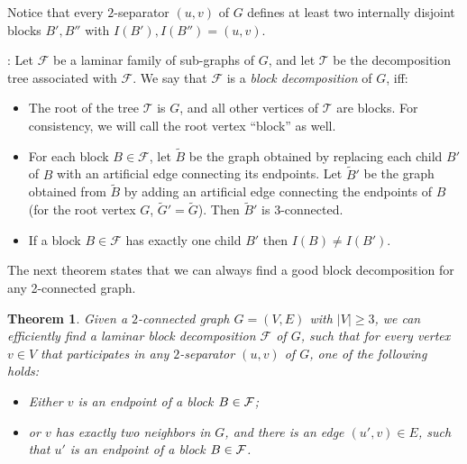 \documentclass[twoside,leqno,twocolumn]{article}
\newcommand{\tset}{{\mathcal T}}
\newcommand{\fset}{{\mathcal{F}}}
\newtheorem{theorem}{Theorem}
\newenvironment{Definition}{{\bf Definition}: }{}
\begin{document}
Notice that every $2$-separator $(u,v)$ of $G$ defines at least two internally disjoint blocks $B',B''$ with $I(B'),I(B'')=(u,v)$.

\begin{Definition}
Let $\fset$ be a laminar family of sub-graphs of $G$, and let $\tset$ be the decomposition tree associated with $\fset$. We say that $\fset$ is a \emph{block decomposition} of $G$, iff:

\begin{itemize}
\item The root of the tree $\tset$ is $G$, and all other vertices of $\tset$ are blocks. For consistency, we will call the root vertex ``block'' as well.

\item For each block $B\in \fset$, let $\tilde{B}$ be the graph obtained by replacing each child $B'$ of $B$
with an artificial edge connecting its endpoints. Let $\tilde{B}'$ be the graph obtained from $\tilde{B}$ by adding an artificial edge connecting the endpoints of $B$ (for the root vertex $G$, $\tilde{G}'=\tilde{G}$). Then $\tilde{B}'$ is $3$-connected.\item If a block $B\in \fset$ has exactly one child $B'$ then $I(B) \neq I(B')$.
\end{itemize} 
\end{Definition}



\iffull
The next theorem states that we can always find a good block decomposition for any 2-connected graph. 
\fi
{}\fi

\begin{theorem}\label{thm: block decomposition}
Given a $2$-connected graph $G=(V,E)$ with $|V|\geq 3$, we can efficiently find a laminar block decomposition $\fset$ of $G$, such that for
every vertex $v\in V$ that participates in any $2$-separator $(u,v)$ of $G$, one of the following holds:
\iffull
\begin{itemize}
\item\fi Either $v$ is an endpoint of a block $B\in\cal F$;
\iffull
\item\fi or  $v$ has exactly two neighbors in $G$, and there is an edge $(u',v)\in E$, such that $u'$ is an endpoint of a block $B\in\cal F$.
\iffull
\end{itemize}
\fi
\end{theorem}
\end{document}
